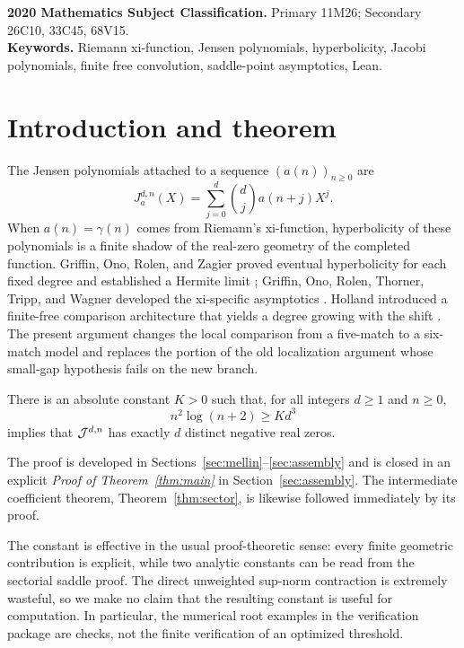 \documentclass[12pt]{article}
\begin{document}
\noindent\textbf{2020 Mathematics Subject Classification.}
Primary 11M26; Secondary 26C10, 33C45, 68V15.\\
\textbf{Keywords.} Riemann xi-function, Jensen polynomials, hyperbolicity,
Jacobi polynomials, finite free convolution, saddle-point asymptotics, Lean.

\tableofcontents

\section{Introduction and theorem}\label{sec:introduction}

The Jensen polynomials attached to a sequence $(a(n))_{n\ge0}$ are
\[
  J_a^{d,n}(X)=\sum_{j=0}^{d}\binom dj a(n+j)X^j.
\]
When $a(n)=\gamma(n)$ comes from Riemann's xi-function, hyperbolicity of
these polynomials is a finite shadow of the real-zero geometry of the
completed function.  Griffin, Ono, Rolen, and Zagier proved eventual
hyperbolicity for each fixed degree and established a Hermite limit
\cite{GORZ2019}; Griffin, Ono, Rolen, Thorner, Tripp, and Wagner developed
the xi-specific asymptotics \cite{GORTTW2020}.  Holland introduced a
finite-free comparison architecture that yields a degree growing with the
shift \cite{Holland2026}.  The present argument changes the local comparison
from a five-match to a six-match model and replaces the portion of the old
localization argument whose small-gap hypothesis fails on the new branch.

\begin{theorem}\label{thm:main}
There is an absolute constant $K>0$ such that, for all integers $d\ge1$ and
$n\ge0$,
\begin{equation}\label{eq:wedge}
       n^2\log(n+2)\ge Kd^3
\end{equation}
implies that $\mathcal J^{d,n}$ has exactly $d$ distinct negative real zeros.
\end{theorem}

The proof is developed in Sections~\ref{sec:mellin}--\ref{sec:assembly} and
is closed in an explicit \emph{Proof of Theorem~\ref{thm:main}} in
Section~\ref{sec:assembly}.  The intermediate coefficient theorem,
Theorem~\ref{thm:sector}, is likewise followed immediately by its proof.

The constant is effective in the usual proof-theoretic sense: every finite
geometric contribution is explicit, while two analytic constants can be
read from the sectorial saddle proof.  The direct unweighted sup-norm
contraction is extremely wasteful, so we make no claim that the resulting
constant is useful for computation.  In particular, the numerical root
examples in the verification package are checks, not the finite verification
of an optimized threshold.
\end{document}
